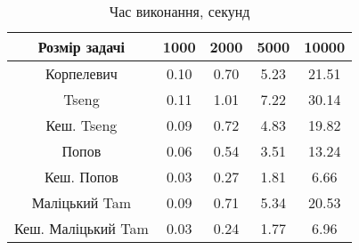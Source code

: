 \begin{table}[H]
	\centering
	\begin{tabular}{|c||c|c|c|c|}\hline
		Розмір задачі & 1000 & 2000 & 5000 & 10000 \\ \hline \hline
		Корпелевич & 0.10 & 0.70 & 5.23 & 21.51 \\ \hline
		Tseng & 0.11 & 1.01 & 7.22 & 30.14 \\ \hline
		Кеш. Tseng & 0.09 & 0.72 & 4.83 & 19.82 \\ \hline
		Попов & 0.06 & 0.54 & 3.51 & 13.24 \\ \hline
		Кеш. Попов & 0.03 & 0.27 & 1.81 & 6.66 \\ \hline
		Маліцький Tam & 0.09 & 0.71 & 5.34 & 20.53 \\ \hline
		Кеш. Маліцький Tam & 0.03 & 0.24 & 1.77 & 6.96 \\ \hline
	\end{tabular}
	\caption{Час виконання, секунд}
\end{table}
